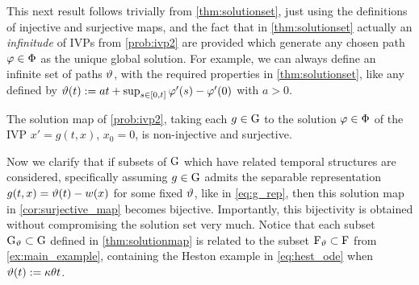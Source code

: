 This next result follows trivially from \autoref{thm:solutionset}, just using the definitions of injective and surjective maps, and the fact that in \autoref{thm:solutionset} actually an \emph{infinitude} of IVPs from \autoref{prob:ivp2} are provided which generate any chosen path $\varphi\in\Phi$ as the unique global solution. For example, we can always define an infinite set of paths $\vartheta$, with the required properties in \autoref{thm:solutionset}, like any defined by $\vartheta(t):=at + \sup_{s\in[0,t]}\varphi'(s)-\varphi'(0)$ with $a>0$.

\begin{corollary}\label{cor:surjective_map}
    The solution map of \autoref{prob:ivp2}, taking each $g\in\mathrm{G}$ to the solution $\varphi\in\Phi$ of the IVP $x'=g(t,x)$, $x_0=0$, is non-injective and surjective.
\end{corollary}

Now we clarify that if subsets of $\mathrm{G}$ which have related temporal structures are considered, specifically assuming $g\in\mathrm{G}$ admits the separable representation $g(t,x) = \vartheta(t)-w(x)$ for some fixed $\vartheta$, like in \autoref{eq:g_rep}, then this solution map in \autoref{cor:surjective_map} becomes bijective. Importantly, this bijectivity is obtained without compromising the solution set very much. Notice that each subset $\mathrm{G}_\vartheta\subset\mathrm{G}$ defined in \autoref{thm:solutionmap} is related to the subset $\mathrm{F}_\vartheta\subset\mathrm{F}$ from \autoref{ex:main_example}, containing the Heston example in \autoref{eq:hest_ode} when $\vartheta(t):=\kappa\theta t$.

